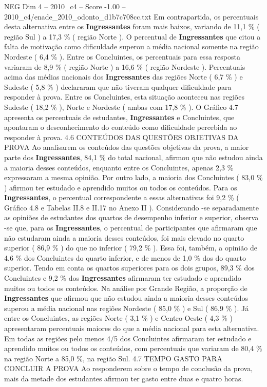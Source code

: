 \begin{textsample}{NEG Dim 4 – 2010\_c4 – Score -1.00 – 2010\_c4/enade\_2010\_odonto\_d1b7c708cc.txt}
Em contrapartida, os percentuais desta alternativa entre os \textbf{Ingressantes} foram mais baixos, variando de 11,1 \% ( região Sul ) a 17,3 \% ( região Norte ).
O percentual de \textbf{Ingressantes} que citou a falta de motivação como dificuldade superou a média nacional somente na região Nordeste ( 6,4 \% ).
Entre os Concluintes, os percentuais para essa resposta variaram de 8,9 \% ( região Norte ) a 16,6 \% ( região Nordeste ).
Percentuais acima das médias nacionais dos \textbf{Ingressantes} das regiões Norte ( 6,7 \% ) e Sudeste ( 5,8 \% ) declararam que não tiveram qualquer dificuldade para responder à prova.
Entre os Concluintes, esta situação aconteceu nas regiões Sudeste ( 18,2 \% ), Norte e Nordeste ( ambas com 17,8 \% ).
O Gráfico 4.7 apresenta os percentuais de estudantes, \textbf{Ingressantes} e Concluintes, que apontaram o desconhecimento do conteúdo como dificuldade percebida ao responder à prova. 4.6 CONTEÚDOS DAS QUESTÕES OBJETIVAS DA PROVA Ao analisarem os conteúdos das questões objetivas da prova, a maior parte dos \textbf{Ingressantes}, 84,1 \% do total nacional, afirmou que não estudou ainda a maioria desses conteúdos, enquanto entre os Concluintes, apenas 2,3 \% expressaram a mesma opinião.
Por outro lado, a maioria dos Concluintes ( 83,0 \% ) afirmou ter estudado e aprendido muitos ou todos os conteúdos.
Para os \textbf{Ingressantes}, o percentual correspondente a essas alternativas foi 9,2 \% ( Gráfico 4.8 e Tabelas II.8 e II.17 no Anexo II ).
Considerando -se separadamente as opiniões de estudantes dos quartos de desempenho inferior e superior, observa -se que, para os \textbf{Ingressantes}, o percentual de participantes que afirmaram que não estudaram ainda a maioria desses conteúdos, foi mais elevado no quarto superior ( 86,9 \% ) do que no inferior ( 79,2 \% ).
Essa foi, também, a opinião de 4,6 \% dos Concluintes do quarto inferior, e de menos de 1,0 \% dos do quarto superior.
Tendo em conta os quartos superiores para os dois grupos, 89,3 \% dos Concluintes e 9,2 \% dos \textbf{Ingressantes} afirmaram ter estudado e aprendido muitos ou todos os conteúdos.
Na análise por Grande Região, a proporção de \textbf{Ingressantes} que afirmou que não estudou ainda a maioria desses conteúdos superou a média nacional nas regiões Nordeste ( 85,0 \% ) e Sul ( 86,9 \% ).
Já entre os Concluintes, as regiões Norte ( 3,1 \% ) e Centro-Oeste ( 4,3 \% ) apresentaram percentuais maiores do que a média nacional para esta alternativa.
Em todas as regiões pelo menos 4/5 dos Concluintes afirmaram ter estudado e aprendido muitos ou todos os conteúdos, com percentuais que variaram de 80,4 \% na região Norte a 85,0 \%, na região Sul. 4.7 TEMPO GASTO PARA CONCLUIR A PROVA Ao responderem sobre o tempo de conclusão da prova, mais da metade dos estudantes afirmou ter gasto entre duas e quatro horas.

\end{textsample}
